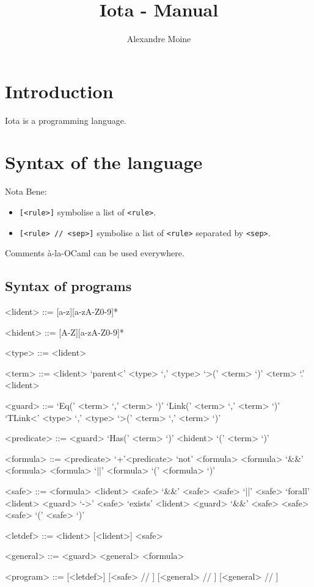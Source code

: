 \documentclass[10pt,a4paper]{article}
\author{Alexandre Moine}
\title{Iota - Manual}
\begin{document}
\maketitle

\section{Introduction}
Iota is a programming language.

\section{Syntax of the language}
Nota Bene:
\begin{itemize}
\item \verb|[<rule>]| symbolise a list of \verb|<rule>|.
\item \verb|[<rule> // <sep>]| symbolise a list of \verb|<rule>| separated by \verb|<sep>|.
\end{itemize}

Comments à-la-OCaml can be used everywhere.

\subsection{Syntax of programs}

\begin{grammar}
  <lident> ::= [a-z][a-zA-Z0-9]*

  <hident> ::= [A-Z][a-zA-Z0-9]*

  <type> ::= <lident>

  <term> ::= <lident>
  \alt `parent<' <type> `,' <type> `>(' <term> `)'
  \alt <term> `.' <lident>

  <guard> ::= `Eq(' <term> `,' <term> `)'
  \alt `Link(' <term> `,' <term> `)'
  \alt `TLink<' <type> `,' <type> `>(' <term> `,' <term> `)'

  <predicate> ::= <guard>
  \alt `Has(' <term> `)'
  \alt <hident> `(' <term> `)'

  <formula> ::= <predicate>
  \alt `+'<predicate>
  \alt `not' <formula>
  \alt <formula> `&&' <formula>
  \alt <formula> `||' <formula>
  \alt `(' <formula> `)'

  <safe> ::= <formula>
  \alt <lident>
  \alt <safe> `&&' <safe>
  \alt <safe> `||' <safe>
  \alt `forall' <lident> <guard> `->' <safe>
  \alt `exists' <lident> <guard> `&&' <safe>
  \alt <safe> <safe>
  \alt `(' <safe> `)'

  <letdef> ::=  <lident> [<lident>] \lit{=} <safe>

  <general> ::=
  <guard> \lit{->} <general>
  \alt \lit{=>} <formula>

  <program> ::=
  [<letdef>]  [<safe> // \lit{;}]  [<general> // \lit{;}]  [<general> // \lit{;}]

\end{grammar}
\end{document}
